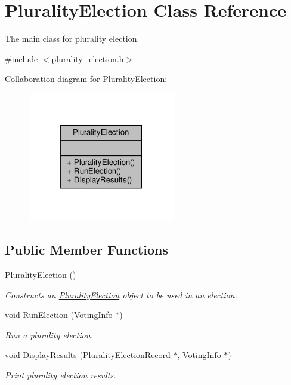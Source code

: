 \hypertarget{classPluralityElection}{}\section{Plurality\+Election Class Reference}
\label{classPluralityElection}


The main class for plurality election.  




{\ttfamily \#include $<$plurality\+\_\+election.\+h$>$}



Collaboration diagram for Plurality\+Election\+:
\nopagebreak
\begin{figure}[H]
\begin{center}
\leavevmode
\includegraphics[width=182pt]{classPluralityElection__coll__graph}
\end{center}
\end{figure}
\subsection*{Public Member Functions}
\begin{DoxyCompactItemize}
\item 
\mbox{\label{classPluralityElection_a9def74d2543d2c9cd71ef5f18a379dc6}} 
\hyperlink{classPluralityElection_a9def74d2543d2c9cd71ef5f18a379dc6}{Plurality\+Election} ()
\begin{DoxyCompactList}\small\item\em Constructs an \hyperlink{classPluralityElection}{Plurality\+Election} object to be used in an election. \end{DoxyCompactList}\item 
void \hyperlink{classPluralityElection_aef5d1b066923d289571e49cc5d9836e7}{Run\+Election} (\hyperlink{classVotingInfo}{Voting\+Info} $\ast$)
\begin{DoxyCompactList}\small\item\em Run a plurality election. \end{DoxyCompactList}\item 
void \hyperlink{classPluralityElection_a7e2e3eb5e4ccdff5f9f57a7a17148608}{Display\+Results} (\hyperlink{classPluralityElectionRecord}{Plurality\+Election\+Record} $\ast$, \hyperlink{classVotingInfo}{Voting\+Info} $\ast$)
\begin{DoxyCompactList}\small\item\em Print plurality election results. \end{DoxyCompactList}\end{DoxyCompactItemize}


